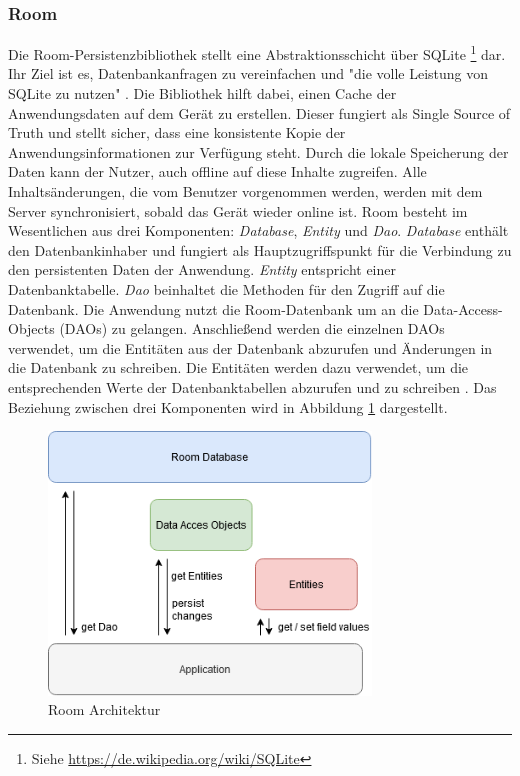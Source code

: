 \documentclass[a4paper]{article}
\begin{document}
\subsubsection{Room}
\label{subsubsec:technologies:bibs:room}
Die Room-Persistenzbibliothek stellt eine Abstraktionsschicht über SQLite \footnote{Siehe \url{https://de.wikipedia.org/wiki/SQLite}} dar. Ihr Ziel ist es, Datenbankanfragen zu vereinfachen und "die volle Leistung von SQLite zu nutzen" \cite{android_room_architecture}. Die Bibliothek hilft dabei, einen Cache der Anwendungsdaten auf dem Gerät zu erstellen. Dieser fungiert als Single Source of Truth und stellt sicher, dass eine konsistente Kopie der Anwendungsinformationen zur Verfügung steht. Durch die lokale Speicherung der Daten kann der Nutzer, auch offline auf diese Inhalte zugreifen. Alle Inhaltsänderungen, die vom Benutzer vorgenommen werden, werden mit dem Server synchronisiert, sobald das Gerät wieder online ist.\newline
Room besteht im Wesentlichen aus drei Komponenten: \textit{Database}, \textit{Entity} und \textit{Dao}. \textit{Database} enthält den Datenbankinhaber und fungiert als Hauptzugriffspunkt für die Verbindung zu den persistenten Daten der Anwendung. \textit{Entity} entspricht einer Datenbanktabelle. \textit{Dao} beinhaltet die Methoden für den Zugriff auf die Datenbank. Die Anwendung nutzt die Room-Datenbank um an die Data-Access-Objects (DAOs) zu gelangen. Anschließend werden die einzelnen DAOs verwendet, um die Entitäten aus der Datenbank abzurufen und Änderungen in die Datenbank zu schreiben. Die Entitäten werden dazu verwendet, um die entsprechenden Werte der Datenbanktabellen abzurufen und zu schreiben \cite{android_room_data_storage}. Das Beziehung zwischen drei Komponenten wird in Abbildung \ref{fig:room} dargestellt.

\begin{figure}[H]
	\centering
	\includegraphics[height=7cm,keepaspectratio]{./images/Room.png}
	\caption{Room Architektur}
	\label{fig:room}
\end{figure}
\end{document}
